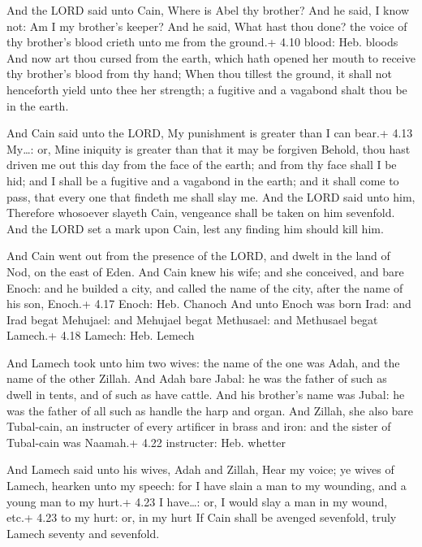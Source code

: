  And the LORD said unto Cain, Where is Abel thy brother?
And he said, I know not: Am I my brother's keeper?  And he
said, What hast thou done? the voice of thy brother's blood crieth unto
me from the ground.+ 4.10 blood: Heb. bloods  And now art
thou cursed from the earth, which hath opened her mouth to receive thy
brother's blood from thy hand;  When thou tillest the
ground, it shall not henceforth yield unto thee her strength; a fugitive
and a vagabond shalt thou be in the earth.

 And Cain said unto the LORD, My punishment is greater than
I can bear.+ 4.13 My\ldots: or, Mine iniquity is greater than that it
may be forgiven  Behold, thou hast driven me out this day
from the face of the earth; and from thy face shall I be hid; and I
shall be a fugitive and a vagabond in the earth; and it shall come to
pass, that every one that findeth me shall slay me.  And
the LORD said unto him, Therefore whosoever slayeth Cain, vengeance
shall be taken on him sevenfold. And the LORD set a mark upon Cain, lest
any finding him should kill him.

 And Cain went out from the presence of the LORD, and
dwelt in the land of Nod, on the east of Eden.  And Cain
knew his wife; and she conceived, and bare Enoch: and he builded a city,
and called the name of the city, after the name of his son, Enoch.+ 4.17
Enoch: Heb. Chanoch  And unto Enoch was born Irad: and Irad
begat Mehujael: and Mehujael begat Methusael: and Methusael begat
Lamech.+ 4.18 Lamech: Heb. Lemech

 And Lamech took unto him two wives: the name of the one
was Adah, and the name of the other Zillah.  And Adah bare
Jabal: he was the father of such as dwell in tents, and of such as have
cattle.  And his brother's name was Jubal: he was the
father of all such as handle the harp and organ.  And
Zillah, she also bare Tubal-cain, an instructer of every artificer in
brass and iron: and the sister of Tubal-cain was Naamah.+ 4.22
instructer: Heb. whetter

 And Lamech said unto his wives, Adah and Zillah, Hear my
voice; ye wives of Lamech, hearken unto my speech: for I have slain a
man to my wounding, and a young man to my hurt.+ 4.23 I have\ldots: or,
I would slay a man in my wound, etc.+ 4.23 to my hurt: or, in my hurt
 If Cain shall be avenged sevenfold, truly Lamech seventy
and sevenfold.

